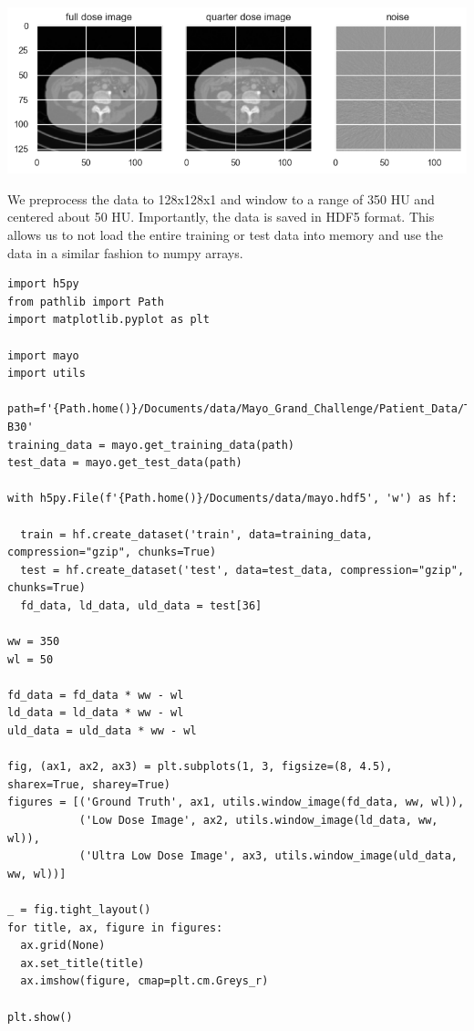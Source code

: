 \documentclass[a4paper, 11pt]{article}
\begin{document}
\begin{center}
\includegraphics[width=.9\linewidth]{./.ob-jupyter/87b4f042c9bbc291a64110740ae09645af97d617.png}
\end{center}
We preprocess the data to 128x128x1 and window to a range of 350 HU and centered about 50 HU. Importantly, the data is saved in HDF5 format. This allows us to not load the entire training or test data into memory and use the data in a similar fashion to numpy arrays.
\begin{verbatim}
import h5py
from pathlib import Path
import matplotlib.pyplot as plt

import mayo
import utils

path=f'{Path.home()}/Documents/data/Mayo_Grand_Challenge/Patient_Data/Training_Image_Data/3mm B30'
training_data = mayo.get_training_data(path)
test_data = mayo.get_test_data(path)

with h5py.File(f'{Path.home()}/Documents/data/mayo.hdf5', 'w') as hf:

  train = hf.create_dataset('train', data=training_data, compression="gzip", chunks=True)
  test = hf.create_dataset('test', data=test_data, compression="gzip", chunks=True)
  fd_data, ld_data, uld_data = test[36]

ww = 350
wl = 50

fd_data = fd_data * ww - wl
ld_data = ld_data * ww - wl
uld_data = uld_data * ww - wl

fig, (ax1, ax2, ax3) = plt.subplots(1, 3, figsize=(8, 4.5), sharex=True, sharey=True)
figures = [('Ground Truth', ax1, utils.window_image(fd_data, ww, wl)),
           ('Low Dose Image', ax2, utils.window_image(ld_data, ww, wl)),
           ('Ultra Low Dose Image', ax3, utils.window_image(uld_data, ww, wl))]

_ = fig.tight_layout()
for title, ax, figure in figures:
  ax.grid(None)
  ax.set_title(title)
  ax.imshow(figure, cmap=plt.cm.Greys_r)

plt.show()
\end{verbatim}
\end{document}
